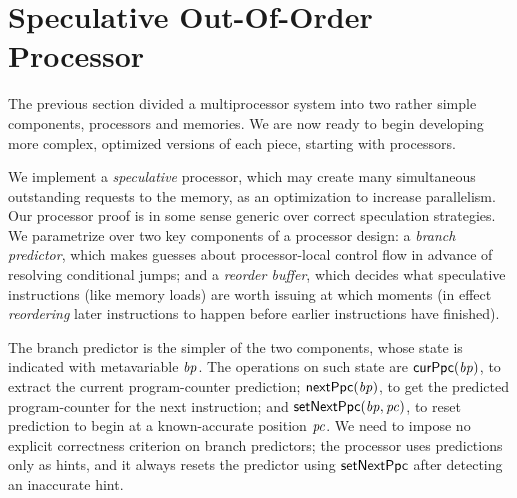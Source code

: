 \section{Speculative Out-Of-Order Processor}\label{sec:ooo}

The previous section divided a multiprocessor system into two rather
simple components, processors and memories.  We are now ready to begin
developing more complex, optimized versions of each piece, starting
with processors.

We implement a \emph{speculative} processor, which may create many
simultaneous outstanding requests to the memory, as an optimization to
increase parallelism.  Our processor proof is in some sense generic
over correct speculation strategies.  We parametrize over two key
components of a processor design: a \emph{branch predictor}, which
makes guesses about processor-local control flow in advance of
resolving conditional jumps; and a
\emph{reorder buffer}, which decides what speculative instructions (like memory loads)
are worth issuing at which moments (in effect \emph{reordering} later
instructions to happen before earlier instructions have finished).

The branch predictor is the simpler of the two components, whose state
is indicated with metavariable $\mathit{bp}$.
The operations on such state are $\mathsf{curPpc}(\mathit{bp})$, to extract the
current program-counter prediction; $\mathsf{nextPpc}(\mathit{bp})$, to get the predicted
program-counter for the next instruction; and $\mathsf{setNextPpc}(\mathit{bp}, \mathit{pc})$,
to reset prediction to begin at a known-accurate position $\mathit{pc}$. We need to impose no explicit correctness criterion on
branch predictors; the processor uses predictions only as hints, and
it always resets the predictor using $\mathsf{setNextPpc}$ after detecting an
inaccurate hint.

